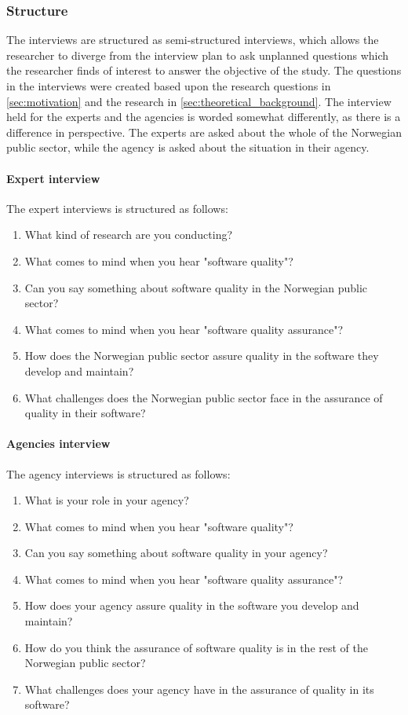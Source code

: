 \subsubsection{Structure}
The interviews are structured as semi-structured interviews, which allows the researcher to diverge from the interview plan to ask unplanned questions which the researcher finds of interest to answer the objective of the study. The questions in the interviews were created based upon the research questions in \autoref{sec:motivation} and the research in \autoref{sec:theoretical_background}. The interview held for the experts and the agencies is worded somewhat differently, as there is a difference in perspective. The experts are asked about the whole of the Norwegian public sector, while the agency is asked about the situation in their agency.

\paragraph{Expert interview}
The expert interviews is structured as follows:

\begin{enumerate}
    \item What kind of research are you conducting?
    \item What comes to mind when you hear "software quality"?
    \item Can you say something about software quality in the Norwegian public sector?
    \item What comes to mind when you hear "software quality assurance"?
    \item How does the Norwegian public sector assure quality in the software they develop and maintain?
    \item What challenges does the Norwegian public sector face in the assurance of quality in their software?
\end{enumerate}

\paragraph{Agencies interview}
The agency interviews is structured as follows:

\begin{enumerate}
    \item What is your role in your agency?
    \item What comes to mind when you hear "software quality"?
    \item Can you say something about software quality in your agency?
    \item What comes to mind when you hear "software quality assurance"?
    \item How does your agency assure quality in the software you develop and maintain?
    \item How do you think the assurance of software quality is in the rest of the Norwegian public sector?
    \item What challenges does your agency have in the assurance of quality in its software?
\end{enumerate}

